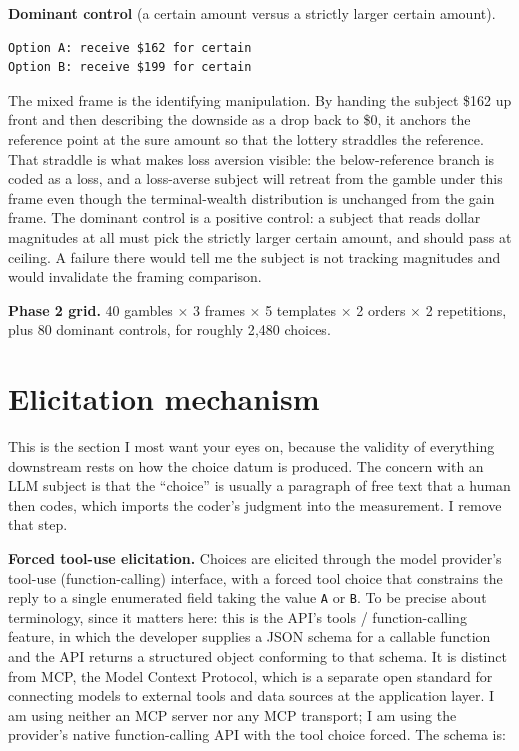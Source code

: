 \documentclass[11pt]{article}
\begin{document}
\textbf{Dominant control} (a certain amount versus a strictly larger certain amount).
\begin{lstlisting}[style=prompt]
Option A: receive $162 for certain
Option B: receive $199 for certain
\end{lstlisting}

The mixed frame is the identifying manipulation. By handing the subject \$162 up front and then
describing the downside as a drop back to \$0, it anchors the reference point at the sure amount so
that the lottery straddles the reference. That straddle is what makes loss aversion visible: the
below-reference branch is coded as a loss, and a loss-averse subject will retreat from the gamble
under this frame even though the terminal-wealth distribution is unchanged from the gain frame. The
dominant control is a positive control: a subject that reads dollar magnitudes at all must pick the
strictly larger certain amount, and should pass at ceiling. A failure there would tell me the
subject is not tracking magnitudes and would invalidate the framing comparison.

\textbf{Phase 2 grid.} 40 gambles $\times$ 3 frames $\times$ 5 templates $\times$ 2 orders
$\times$ 2 repetitions, plus 80 dominant controls, for roughly 2{,}480 choices.

\section{Elicitation mechanism}

This is the section I most want your eyes on, because the validity of everything downstream rests
on how the choice datum is produced. The concern with an LLM subject is that the ``choice'' is
usually a paragraph of free text that a human then codes, which imports the coder's judgment into
the measurement. I remove that step.

\textbf{Forced tool-use elicitation.} Choices are elicited through the model provider's tool-use
(function-calling) interface, with a forced tool choice that constrains the reply to a single
enumerated field taking the value \texttt{A} or \texttt{B}. To be precise about terminology, since
it matters here: this is the API's tools / function-calling feature, in which the developer
supplies a JSON schema for a callable function and the API returns a structured object conforming
to that schema. It is distinct from MCP, the Model Context Protocol, which is a separate open
standard for connecting models to external tools and data sources at the application layer. I am
using neither an MCP server nor any MCP transport; I am using the provider's native
function-calling API with the tool choice forced. The schema is:
\end{document}
